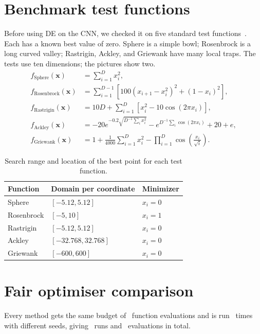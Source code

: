 \section{Benchmark test functions}
Before using DE on the CNN, we checked it on five standard test functions~\cite{jamil2013functions}. Each has a known best value of zero. Sphere is a simple bowl; Rosenbrock is a long curved valley; Rastrigin, Ackley, and Griewank have many local traps. The tests use ten dimensions; the pictures show two.
\begin{align}
f_{\mathrm{Sphere}}(\mathbf x)&=\sum_{i=1}^{D}x_i^2,\\
f_{\mathrm{Rosenbrock}}(\mathbf x)&=\sum_{i=1}^{D-1}\left[100(x_{i+1}-x_i^2)^2+(1-x_i)^2\right],\\
f_{\mathrm{Rastrigin}}(\mathbf x)&=10D+\sum_{i=1}^{D}\left[x_i^2-10\cos(2\pi x_i)\right],\\
f_{\mathrm{Ackley}}(\mathbf x)&=-20e^{-0.2\sqrt{D^{-1}\sum_i x_i^2}}
-e^{D^{-1}\sum_i\cos(2\pi x_i)}+20+e,\\
f_{\mathrm{Griewank}}(\mathbf x)&=1+\frac{1}{4000}\sum_{i=1}^{D}x_i^2-\prod_{i=1}^{D}\cos\left(\frac{x_i}{\sqrt{i}}\right).
\end{align}
\begin{table}[htbp]\centering\small
\caption{Search range and location of the best point for each test function.}
\begin{tabular}{lll}\toprule
Function & Domain per coordinate & Minimizer\\\midrule
Sphere & $[-5.12,5.12]$ & $x_i=0$\\
Rosenbrock & $[-5,10]$ & $x_i=1$\\
Rastrigin & $[-5.12,5.12]$ & $x_i=0$\\
Ackley & $[-32.768,32.768]$ & $x_i=0$\\
Griewank & $[-600,600]$ & $x_i=0$\\\bottomrule
\end{tabular}
\end{table}


\section{Fair optimiser comparison}
Every method gets the same budget of \BenchmarkBudget\ function evaluations and is run \BenchmarkRuns\ times with different seeds, giving \TotalBenchmarkRuns\ runs and \TotalBenchmarkEvaluations\ evaluations in total.

